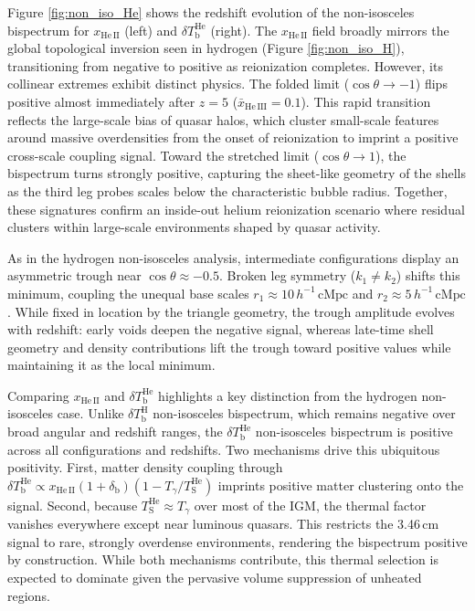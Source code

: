 \documentclass[apj,twocolumn, appendixfloats, twocolappendix, numberedappendix, tighten]{openjournal}
\begin{document}
Figure \ref{fig:non_iso_He} shows the redshift evolution of the non-isosceles bispectrum for $x_\mathrm{He\,II}$ (left) and $\delta T_\mathrm{b}^\mathrm{He}$ (right). The $x_\mathrm{He\,II}$ field broadly mirrors the global topological inversion seen in hydrogen (Figure \ref{fig:non_iso_H}), transitioning from negative to positive as reionization completes. However, its collinear extremes exhibit distinct physics. The folded limit ($\cos\theta \to -1$) flips positive almost immediately after $z = 5$ ($\bar{x}_\mathrm{He\,III} = 0.1$). This rapid transition reflects the large-scale bias of quasar halos, which cluster small-scale  features around massive overdensities from the onset of reionization to imprint a positive cross-scale coupling signal. Toward the stretched limit ($\cos\theta \to 1$), the bispectrum turns strongly positive, capturing the sheet-like geometry of the  shells as the third leg probes scales below the characteristic  bubble radius. Together, these signatures confirm an inside-out helium reionization scenario where residual  clusters within large-scale environments shaped by quasar activity.



As in the hydrogen non-isosceles analysis, intermediate configurations display an asymmetric trough near $\cos\theta \approx -0.5$. Broken leg symmetry ($k_1 \neq k_2$) shifts this minimum, coupling the unequal base scales $r_1 \approx 10\,h^{-1}\,\mathrm{cMpc}$ and $r_2 \approx 5\,h^{-1}\,\mathrm{cMpc}$. While fixed in location by the triangle geometry, the trough amplitude evolves with redshift: early  voids deepen the negative signal, whereas late-time shell geometry and density contributions lift the trough toward positive values while maintaining it as the local minimum.


Comparing $x_\mathrm{He\,II}$ and $\delta T_\mathrm{b}^\mathrm{He}$ highlights a key distinction from the hydrogen non-isosceles case. Unlike $\delta T_\mathrm{b}^\mathrm{H}$ non-isosceles bispectrum, which remains negative over broad angular and redshift ranges, the  $\delta T_\mathrm{b}^\mathrm{He}$ non-isosceles bispectrum is positive across all configurations and redshifts. Two mechanisms drive this ubiquitous positivity. First, matter density coupling through $\delta T_\mathrm{b}^\mathrm{He} \propto x_\mathrm{He\,II}(1+\delta_\mathrm{b})(1 - T_\gamma/T_\mathrm{S}^\mathrm{He})$ imprints positive matter clustering onto the signal. Second, because $T_\mathrm{S}^\mathrm{He} \approx T_\gamma$ over most of the IGM, the thermal factor vanishes everywhere except near luminous quasars. This restricts the 3.46\,cm signal to rare, strongly overdense environments, rendering the bispectrum positive by construction. While both mechanisms contribute, this thermal selection is expected to dominate given the pervasive volume suppression of unheated regions.
\end{document}
